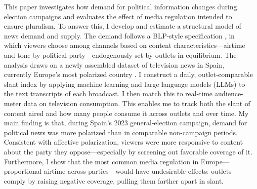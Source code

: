 \documentclass[12pt]{article}
\begin{document}
This paper investigates how  demand for political information changes during election campaigns and evaluates the effect of  media regulation intended to ensure pluralism.  To answer this, I develop and estimate a structural model of news demand and supply. The demand follows  a BLP-style specification \citep{berry_blp}, in which viewers choose among channels based on content characteristics—airtime and tone by political party—endogenously set by outlets in equilibrium. The analysis draws on a newly assembled dataset of television news in Spain, currently Europe’s most polarized country \citep{edelman_trust_2023}.  I construct a daily, outlet-comparable slant index by applying machine learning and large language models (LLMs) to the text transcripts of each broadcast. I then match this to real-time audience-meter data on television consumption. This enables me to track both the slant of content aired and  how many people consume it across outlets and over time. My main finding is that, during Spain’s 2023 general-election campaign, demand for political news was more polarized than in comparable non-campaign periods. Consistent with affective polarization, viewers were more responsive to content about the party they oppose—especially by screening out favorable coverage of it. Furthermore, I show that the most common media regulation in Europe—proportional airtime across parties—would have undesirable effects: outlets comply by raising negative coverage, pulling them farther apart in slant.


\end{document}
